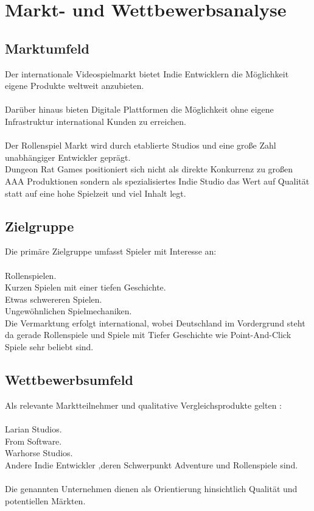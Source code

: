 \documentclass[envcountsame,envcountchap deutsch]{i-studis}
\begin{document}
\chapter{Markt- und Wettbewerbsanalyse}
\section{Marktumfeld}

Der internationale Videospielmarkt bietet Indie Entwicklern die Möglichkeit eigene Produkte weltweit anzubieten.
\\
\\
Darüber hinaus bieten Digitale Plattformen die Möglichkeit ohne eigene Infrastruktur international Kunden zu erreichen.
\\
\\
Der Rollenspiel Markt wird durch etablierte Studios und eine große Zahl unabhängiger Entwickler geprägt.
\\
Dungeon Rat Games positioniert sich nicht als direkte Konkurrenz zu großen AAA Produktionen sondern als spezialisiertes Indie Studio das Wert auf Qualität statt auf eine hohe Spielzeit  und viel Inhalt legt.

\section{Zielgruppe}
Die primäre Zielgruppe umfasst Spieler mit Interesse an: \\
\\
Rollenspielen.\\
Kurzen Spielen mit einer tiefen Geschichte. \\
Etwas schwereren Spielen. \\
Ungewöhnlichen Spielmechaniken.\\

Die Vermarktung erfolgt international, wobei Deutschland im Vordergrund steht da gerade Rollenspiele und Spiele mit Tiefer Geschichte wie Point-And-Click Spiele sehr beliebt sind. 
\pagebreak
\section{Wettbewerbsumfeld}
Als relevante Marktteilnehmer und qualitative Vergleichsprodukte gelten : \\
\\
Larian Studios. \\
From Software. \\
Warhorse Studios. \\
Andere Indie Entwickler ,deren Schwerpunkt Adventure und Rollenspiele sind.
\\
\\
Die genannten Unternehmen dienen als Orientierung hinsichtlich Qualität und potentiellen Märkten.
\end{document}
